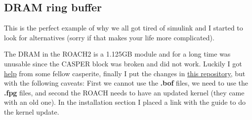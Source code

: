 \subsection{DRAM ring buffer}
This is the perfect example of why we all got tired of simulink and I started to look for alternatives (sorry if that makes your life more complicated).

The DRAM in the ROACH2 is a 1.125GB module and for a long time was unusable since the CASPER block was broken and did not work. Luckily I got \href{https://www.mail-archive.com/casper@lists.berkeley.edu/msg08146.html}{help} from some fellow casperite, finally I put the changes in \href{https://github.com/sebajor/mlib_devel}{this repository}, but with the following caveats: First we cannot use the \textbf{.bof} files, we need to use the \textbf{.fpg} files, and second the ROACH needs to have an updated kernel (they came with an old one). In the installation section I placed a link with the guide to do the kernel update.



